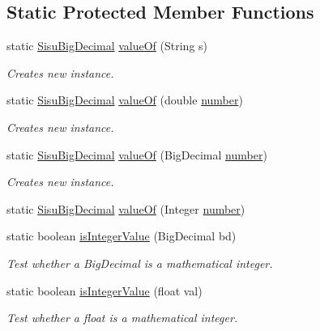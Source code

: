 \subsection*{Static Protected Member Functions}
\begin{DoxyCompactItemize}
\item 
static \hyperlink{classcom_1_1aarrelaakso_1_1drawl_1_1_sisu_big_decimal}{Sisu\+Big\+Decimal} \hyperlink{classcom_1_1aarrelaakso_1_1drawl_1_1_sisu_big_decimal_a076ac8cd04ac04e39f7f3fcc7ce9a4a1}{value\+Of} (String s)
\begin{DoxyCompactList}\small\item\em Creates new instance. \end{DoxyCompactList}\item 
static \hyperlink{classcom_1_1aarrelaakso_1_1drawl_1_1_sisu_big_decimal}{Sisu\+Big\+Decimal} \hyperlink{classcom_1_1aarrelaakso_1_1drawl_1_1_sisu_big_decimal_abdd37c9d8ee68f034fc15ca6777a1de7}{value\+Of} (double \hyperlink{classcom_1_1aarrelaakso_1_1drawl_1_1_sisu_big_decimal_af27e00f82037e4c3658558cd6c81af06}{number})
\begin{DoxyCompactList}\small\item\em Creates new instance. \end{DoxyCompactList}\item 
static \hyperlink{classcom_1_1aarrelaakso_1_1drawl_1_1_sisu_big_decimal}{Sisu\+Big\+Decimal} \hyperlink{classcom_1_1aarrelaakso_1_1drawl_1_1_sisu_big_decimal_a251d1a42f8906fe5b7da6981673464d2}{value\+Of} (Big\+Decimal \hyperlink{classcom_1_1aarrelaakso_1_1drawl_1_1_sisu_big_decimal_af27e00f82037e4c3658558cd6c81af06}{number})
\begin{DoxyCompactList}\small\item\em Creates new instance. \end{DoxyCompactList}\item 
static \hyperlink{classcom_1_1aarrelaakso_1_1drawl_1_1_sisu_big_decimal}{Sisu\+Big\+Decimal} \hyperlink{classcom_1_1aarrelaakso_1_1drawl_1_1_sisu_big_decimal_a9dbb81d513bd251ef0c20696b272ddc3}{value\+Of} (Integer \hyperlink{classcom_1_1aarrelaakso_1_1drawl_1_1_sisu_big_decimal_af27e00f82037e4c3658558cd6c81af06}{number})
\item 
static boolean \hyperlink{classcom_1_1aarrelaakso_1_1drawl_1_1_sisu_big_decimal_a91b8c8917efe62714376acabd7659a00}{is\+Integer\+Value} (Big\+Decimal bd)
\begin{DoxyCompactList}\small\item\em Test whether a Big\+Decimal is a mathematical integer. \end{DoxyCompactList}\item 
static boolean \hyperlink{classcom_1_1aarrelaakso_1_1drawl_1_1_sisu_big_decimal_ac3cd755159a2833c6b90aece5ca86b7e}{is\+Integer\+Value} (float val)
\begin{DoxyCompactList}\small\item\em Test whether a float is a mathematical integer. \end{DoxyCompactList}\end{DoxyCompactItemize}
